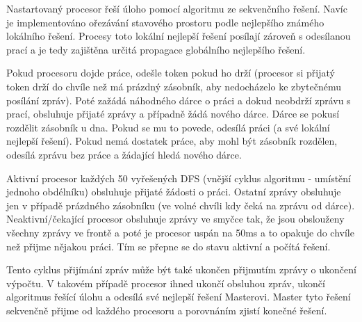 \documentclass[slovak]{article}
\begin{document}
Nastartovaný procesor řeší úloho pomocí algoritmu ze sekvenčního řešení.
Navíc je implementováno ořezávání stavového prostoru podle nejlepšího
známého lokálního řešení. Procesy toto lokální nejlepší řešení posílají
zároveň s odesílanou prací a je tedy zajištěna určitá propagace globálního
nejlepšího řešení.

Pokud procesoru dojde práce, odešle token pokud ho drží (procesor si
přijatý token drží do chvíle než má prázdný zásobník, aby nedocházelo ke
zbytečnému posílání zpráv). Poté zažádá náhodného dárce o práci a dokud
neobdrží zprávu s prací, obsluhuje přijaté zprávy a případně žádá nového
dárce. Dárce se pokusí rozdělit zásobník u dna. Pokud se mu to povede,
odesílá práci (a své lokální nejlepší řešení). Pokud nemá dostatek práce,
aby mohl být zásobník rozdělen, odesílá zprávu bez práce a žádající hledá
nového dárce.

Aktivní procesor každých 50 vyřešených DFS (vnější cyklus algoritmu -
umístění jednoho obdélníku) obsluhuje přijaté žádosti o práci. Ostatní
zprávy obsluhuje jen v případě prázdného zásobníku (ve volné chvíli kdy
čeká na zprávu od dárce). Neaktivní/čekající procesor obsluhuje zprávy ve
smyčce tak, že jsou obslouženy všechny zprávy ve frontě a poté je procesor
uspán na 50ms a to opakuje do chvíle než přijme nějakou práci. Tím se
přepne se do stavu aktivní a počítá řešení.

Tento cyklus přijímání zpráv může být také ukončen přijmutím zprávy o
ukončení výpočtu. V takovém případě procesor ihned ukončí obsluhou zpráv,
ukončí algoritmus řešící úlohu a odesílá své nejlepší řešení Masterovi.
Master tyto řešení sekvenčně přijme od každého procesoru a porovnáním
zjistí konečné řešení.
\end{document}

